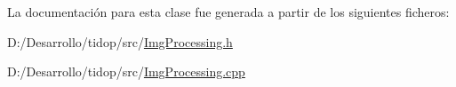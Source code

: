 La documentación para esta clase fue generada a partir de los siguientes ficheros\+:\begin{DoxyCompactItemize}
\item 
D\+:/\+Desarrollo/tidop/src/\hyperlink{_img_processing_8h}{Img\+Processing.\+h}\item 
D\+:/\+Desarrollo/tidop/src/\hyperlink{_img_processing_8cpp}{Img\+Processing.\+cpp}\end{DoxyCompactItemize}

